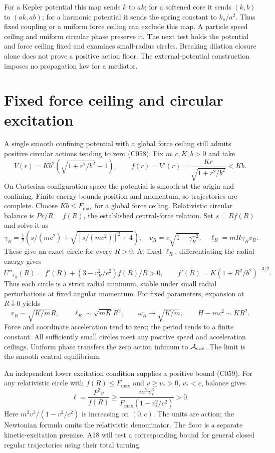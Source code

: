 \documentclass[11pt,a4paper]{article}
\begin{document}
For a Kepler potential this map sends $k$ to $ak$; for a softened core it
sends $(k,b)$ to $(ak,ab)$; for a harmonic potential it sends the spring
constant to $k_s/a^2$. Thus fixed coupling or a uniform force ceiling can
exclude this map. A particle speed ceiling and uniform circular phase
preserve it. The next test holds the potential and force ceiling fixed and
examines small-radius circles. Breaking dilation closure alone does not
prove a positive action floor. The external-potential construction imposes
no propagation law for a mediator.

\section{Fixed force ceiling and circular excitation}
A single smooth confining potential with a global force ceiling still admits
positive circular actions tending to zero (C058). Fix $m,c,K,b>0$ and take
\[
 V(r)=Kb^2(\sqrt{1+r^2/b^2}-1),\qquad
 f(r)=V'(r)=\frac{Kr}{\sqrt{1+r^2/b^2}}<Kb.
\]
On Cartesian configuration space the potential is smooth at the origin and
confining. Finite energy bounds position and momentum, so trajectories are
complete. Choose $Kb\le F_{\max}$ for a global force ceiling.
Relativistic circular balance is $Pv/R=f(R)$, the established central-force
relation\cite{Aguirregabiria2004Circular}. Set $s=Rf(R)$ and solve it as
\[
 \gamma_R=\tfrac12\left(s/(mc^2)+\sqrt{[s/(mc^2)]^2+4}\right),
 \quad v_R=c\sqrt{1-\gamma_R^{-2}},\quad \ell_R=mR\gamma_Rv_R.
\]
These give an exact circle for every $R>0$. At fixed $\ell_R$, differentiating
the radial energy gives
\[
 U''_{\ell_R}(R)=f'(R)+(3-v_R^2/c^2)f(R)/R>0,
 \qquad f'(R)=K(1+R^2/b^2)^{-3/2}.
\]
Thus each circle is a strict radial minimum, stable under small radial
perturbations at fixed angular momentum. For fixed parameters, expansion at
$R\downarrow0$ yields
\[
 v_R\sim\sqrt{K/m}R,\qquad \ell_R\sim\sqrt{mK}R^2,\qquad
 \omega_R\to\sqrt{K/m},\qquad H-mc^2\sim KR^2.
\]
Force and coordinate acceleration tend to zero; the period tends to a finite
constant. All sufficiently small circles meet any positive speed and
acceleration ceilings. Uniform phase transfers the zero action infimum to
$\mathcal A_{\rm cov}$. The limit is the smooth central equilibrium.

An independent lower excitation condition supplies a positive bound (C059).
For any relativistic circle with $f(R)\le F_{\max}$ and $v\ge v_*>0$,
$v_*<c$, balance gives
\[
 \ell=\frac{P^2v}{f(R)}
 \ge\frac{m^2v_*^3}{F_{\max}(1-v_*^2/c^2)}>0.
\]
Here $m^2v^3/(1-v^2/c^2)$ is increasing on $(0,c)$. The units are action;
the Newtonian formula omits the relativistic denominator. The floor is a
separate kinetic-excitation premise. A18 will test a corresponding bound
for general closed regular trajectories using their total turning.
\end{document}

